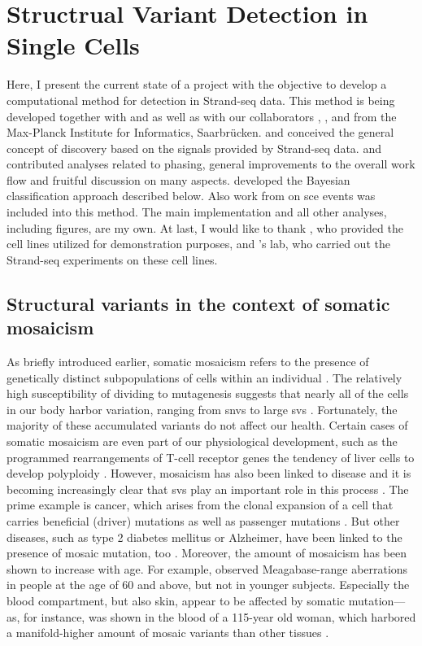 \chapter{Structrual Variant Detection in Single Cells}
\label{sec:mosaicatcher}

Here, I present the current state of a project with the objective to develop a
computational method for \sv detection in Strand-seq data. This method is being
developed together with \jan and \ashley as well as with our collaborators
\david, \maryam, and \marschall from the Max-Planck Institute for Informatics,
Saarbrücken. \ashley and \jan conceived the general concept of \sv discovery
based on the signals provided by Strand-seq data. \marschall and \david
contributed analyses related to phasing, general improvements to the overall
work flow and fruitful discussion on many aspects. \maryam developed the
Bayesian classification approach described below. Also work from \venla on
\acl{sce} events was included into this method.
The main implementation and all other analyses, including figures, are my own.
At last, I would like to thank \balca, who provided the cell lines utilized for
demonstration purposes, and \landsdorp's lab, who carried out the Strand-seq
experiments on these cell lines.





\section{Structural variants in the context of somatic mosaicism}
\label{sec:mosaic_mosaicism}

As briefly introduced earlier, somatic mosaicism refers to the presence of
genetically distinct subpopulations of cells within an individual
\citep{Youssoufian2002}. The relatively high susceptibility of dividing to mutagenesis
suggests that nearly all of the cells in our body harbor variation, ranging from \acp{snv}
to large \acp{sv} \citep{Campbell2015}. Fortunately, the majority of these
accumulated variants do not affect our health. Certain cases of somatic mosaicism are even
part of our physiological development, such as the programmed rearrangements of
T-cell receptor genes the tendency of liver cells to develop polyploidy
\citep{Forsberg2017,Davoli2011}. However, mosaicism has also been linked to
disease and it is becoming increasingly clear that \aclp{sv} play an important
role in this process \citep{Forsberg2017}. The prime example is cancer, which
arises from the clonal expansion of a cell that carries beneficial (driver)
mutations as well as passenger mutations \citep{Forsberg2017}. But other
diseases, such as type 2 diabetes mellitus or Alzheimer, have been linked to the
presence of mosaic mutation, too \citep{Forsberg2017}. Moreover, the amount of
mosaicism has been shown to increase with age. For example, \citet{Forsberg2012}
observed Meagabase-range aberrations in people at the age of 60 and above, but not in
younger subjects. Especially the blood compartment, but also skin, appear to be
affected by somatic mutation---as, for instance, was shown in the blood of a
115-year old woman, which harbored a manifold-higher amount of mosaic variants
than other tissues \citep{Forsberg2017,Holstege2014}.

